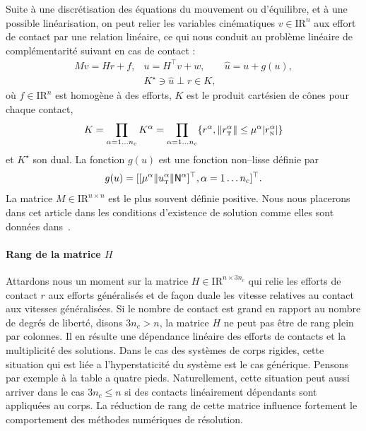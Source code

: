 \documentclass{CSMA2017}
\def\RR{\nbR}
\def\nbR{\ensuremath{\mathrm{I\!R}}} %
\def\n{{\hbox{\tiny{N}}}}
\def\t{{\hbox{\tiny{T}}}}
\begin{document}
Suite à une discrétisation des équations du mouvement ou d'équilibre, et à une possible linéarisation, on peut relier les variables cinématiques $ {v} \in \RR^n$ aux effort de contact par une relation linéaire, ce qui nous conduit au problème linéaire de complémentarité suivant en cas de contact :
\begin{equation}\label{eq:soccp1-intro}
  \begin{array}{rcl}
    M v = {H} {r} + {f}, &
    u = H^\top v + w,  &
    \hat u = u + g(u) ,\\[1mm]
    &    K^\star \ni {\hat u} \perp r \in K,&
  \end{array}
\end{equation}
où $f\in \RR^n$ est homogène à des efforts, $K$ est le produit cartésien de cônes pour chaque contact, 
\begin{equation}
  \label{eq:CC}
  K = \prod_{\alpha=1\ldots n_c} K^{\alpha}  = \prod_{\alpha=1\ldots n_c} \{r^\alpha, \|r^\alpha_\t \| \leq \mu^\alpha |r^\alpha_\n| \}
\end{equation}
et $K^\star$ son dual. La fonction $g(u)$ est une fonction non--lisse définie par 
\begin{equation}
g(u) = [[\mu^\alpha  \|u^\alpha_\t\| {\sf N}^\alpha]^\top, \alpha = 1\ldots n_c]^\top\label{eq:gg}. 
\end{equation}
La matrice $M \in \RR^{n \times n}$ est le plus souvent définie positive. Nous nous placerons dans cet article dans les conditions d'existence de solution comme elles sont données dans~\cite{Klarbring.Pang1998,Acary.ea_ZAMM2011}.


\paragraph{Rang de la matrice $H$} Attardons nous un moment sur la matrice $H \in \RR^{n\times 3n_c} $ qui relie les efforts de contact $r$ aux efforts généralisés et de façon duale les vitesse relatives au contact aux vitesses généralisées. Si le nombre de contact est grand en rapport au nombre de degrés de liberté, disons $3 n_c > n$, la matrice $H$ ne peut pas être de rang plein par colonnes. Il en résulte une dépendance linéaire des efforts de contacts et la multiplicité des solutions. Dans le cas des systèmes de corps rigides, cette situation qui est liée a l'hyperstaticité du système est le cas générique. Pensons par exemple à la table a quatre pieds. Naturellement, cette situation peut aussi arriver dans le cas $3 n_c \leq  n$ si des contacts linéairement dépendants sont appliquées au corps. La réduction de rang de cette matrice influence fortement le comportement des méthodes numériques de résolution. 
\end{document}
